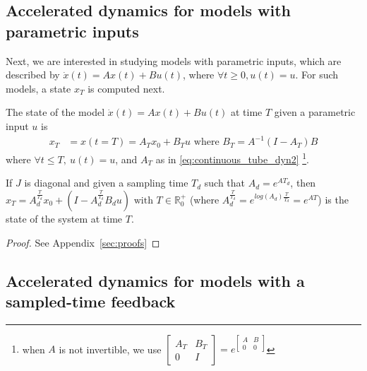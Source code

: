 \documentclass[sigconf]{llncs}
\newcommand{\mat}[1]{{#1}}
\renewcommand{\vec}[1]{{#1}}
\begin{document}
 \subsection{Accelerated dynamics for models with parametric inputs}\label{sec:real_discrete_param_inputs}
 Next, we are interested in studying models with parametric inputs, 
 which are described by $\dot{\vec{x}}(t)=\mat{A}\vec{x}(t)+\mat{B}\vec{u}(t)$, where $\forall t\geq 0, \vec{u}(t)=\vec{u}$. 
 For such models, a state $\vec{x}_T$ is computed next.  
\begin{theorem}
The state of the model $\dot{\vec{x}}(t)=\mat{A}\vec{x}(t)+\mat{B}\vec{u}(t)$ at time $T$ given a parametric input $\vec{u}$ is 
 \begin{align}
 \vec{x}_T&=\vec{x}(t=T)=\mat{A}_T\vec{x}_0 + \mat{B}_T\vec{u} \text{ where } \mat{B}_T=\mat{A}^{-1}(\mat{I}-\mat{A}_T)\mat{B} 
 \end{align}
 where $\forall t \leq T,\ \vec{u}(t)=\vec{u}$, and $\mat{A}_T$ as in \eqref{eq:continuous_tube_dyn2}
 \footnote{when $\mat{A}$ is not invertible, we use $\left[\begin{array}{cc}\mat{A}_T&\mat{B}_T\\ 0&\mat{I}\end{array}\right]=e^{\left[\begin{array}{cc}\mat{A}&\mat{B}\\0&0\end{array}\right]}$}.
 \end{theorem}
 \begin{corollary}
 If $\mat{J}$ is diagonal and given a sampling time $T_d$ such that $A_d=e^{\mat{A} T_d}$, 
 then $\vec{x}_T=A_d^{\frac{T}{T_d}}\vec{x}_0+(\mat{I}-\mat{A}_d^{\frac{T}{T_d}}\mat{B}_d\vec{u}) \text{ with } T \in \mathbb{R}_0^+$ (where $\mat{A}_d^{\frac{T}{T_d}} = e^{log(\mat{A}_d) \frac{T}{T_d}} = e^{\mat{A} T}$) is the state of the system at time $T$.
 \end{corollary}
\begin{proof}
See Appendix~\ref{sec:proofs}
\end{proof}

 \subsection{Accelerated dynamics for models with a sampled-time feedback}\label{sec:real_discrete_feedback_inputs}
\end{document}

